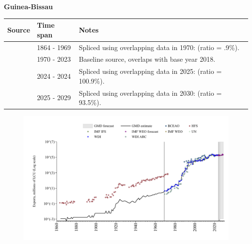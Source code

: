 \documentclass[12pt,a4paper,landscape]{article}
\begin{document}
\begin{adjustbox}{max totalsize={\paperwidth}{\paperheight},center}
\begin{minipage}[t][\textheight][t]{\textwidth}
\vspace*{0.5cm}
{}
\begin{center}
{\Large\bfseries Guinea-Bissau}
\end{center}
\vspace{0.5cm}
\begin{table}[H]
\centering
\small
\begin{tabular}{|l|l|l|}
\hline
\textbf{Source} & \textbf{Time span} & \textbf{Notes} \\
\hline
\rowcolor{white}\cite{HFS}& 1864 - 1969 &Spliced using overlapping data in 1970: (ratio = .9\%).\\
\rowcolor{lightgray}\cite{WDI}& 1970 - 2023 &Baseline source, overlaps with base year 2018.\\
\rowcolor{white}\cite{BCEAO}& 2024 - 2024 &Spliced using overlapping data in 2025: (ratio = 100.9\%).\\
\rowcolor{lightgray}\cite{IMF_WEO_forecast}& 2025 - 2029 &Spliced using overlapping data in 2030: (ratio = 93.5\%).\\
\hline
\end{tabular}
\end{table}
\begin{figure}[H]
\centering
\includegraphics[width=\textwidth,height=0.6\textheight,keepaspectratio]{graphs/GNB_exports.pdf}
\end{figure}
\end{minipage}
\end{adjustbox}
\end{document}
